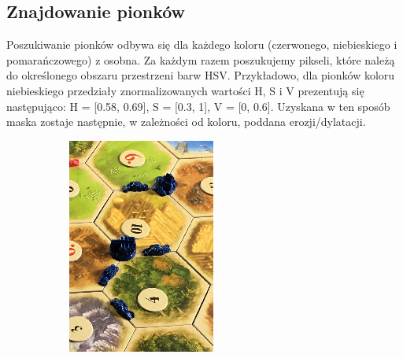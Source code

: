 \documentclass[a4paper]{article}
\begin{document}
    \subsection{Znajdowanie pionków}
    Poszukiwanie pionków odbywa się dla każdego koloru (czerwonego, niebieskiego i pomarańczowego) z osobna.
    Za każdym razem poszukujemy pikseli, które należą do określonego obszaru przestrzeni barw HSV.
    Przykładowo, dla pionków koloru niebieskiego przedziały znormalizowanych wartości H, S i V prezentują się następująco:
    H = [0.58, 0.69], S = [0.3, 1], V = [0, 0.6].
    Uzyskana w ten sposób maska zostaje następnie, w zależności od koloru, poddana erozji/dylatacji.
     \begin{figure}[H]
        \begin{subfigure}[t]{0.3\linewidth}
            \includegraphics[width=\linewidth]{pictures/steps/pawns_fragment.png}

\end{subfigure}
\end{figure}
\end{document}
